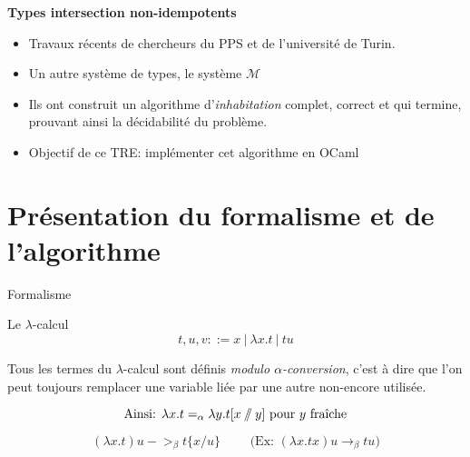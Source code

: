 \documentclass{beamer}
\newcommand\heading[1]{%
  \par\bigskip
  {\Large\bfseries#1}\par\smallskip}
\newcommand{\sslash}{\mathbin{/\mkern-6mu/}}
\begin{document}
    \begin{frame}
    \heading{Types intersection non-idempotents}
    \begin{itemize}
        \item Travaux récents de chercheurs du PPS et de l'université de Turin.
        \item Un autre système de types, le système $\mathcal{M}$
        \item Ils ont construit un algorithme d'\emph{inhabitation} complet, correct et qui termine, prouvant ainsi la décidabilité du problème.
        \item Objectif de ce TRE: implémenter cet algorithme en OCaml
    \end{itemize}
    \end{frame}
    
    
    \section{Présentation du formalisme et de l'algorithme}
    \begin{frame}{Formalisme}
        \begin{block}{Le $\lambda$-calcul}
        \vspace{-.3cm}
           \begin{equation*}
           t, u, v ::= x\ |\ \lambda x.t\ |\ tu 
           \end{equation*}	
        \end{block}
        
        \begin{definition}
            Tous les termes du $\lambda$-calcul sont définis \emph{modulo $\alpha$-conversion}, c'est à dire que l'on peut toujours remplacer une variable liée par une autre non-encore utilisée.
            
            \begin{equation*}
            \text{Ainsi: } \lambda x.t =_\alpha \lambda y.t[x\sslash y] \text{ pour $y$ fraîche}
            \end{equation*}
        \end{definition}
        \begin{definition}
            \vspace{-.3cm}
            \begin{equation*}
              (\lambda x.t) u ->_\beta t\{x/u\} \qquad\text{ (Ex: $(\lambda x.tx)u \rightarrow_\beta tu$)}
            \end{equation*}
        \end{definition}
    \end{frame}
\end{document}
